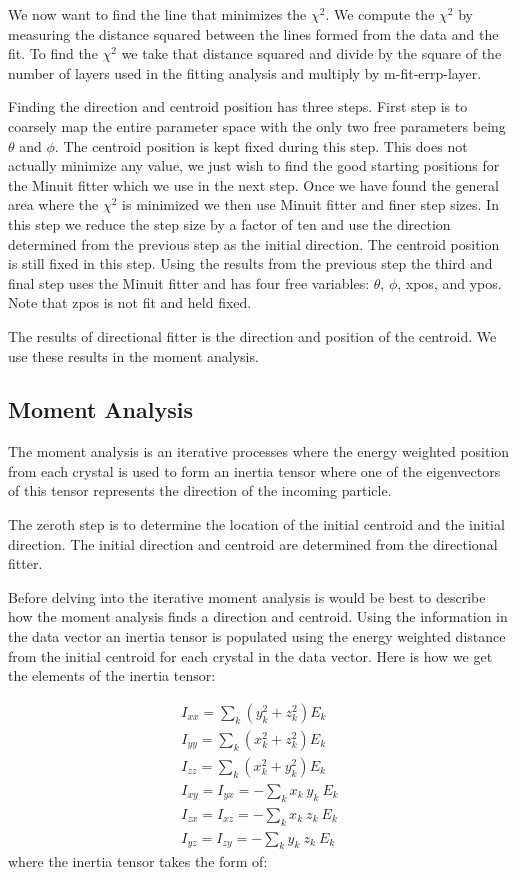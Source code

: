 \documentclass[11pt]{article}
\begin{document}
We now want to find the line that minimizes the $\chi^2$.  We compute the $\chi^2$ by measuring the distance squared between the lines formed from the data and the fit.  To find the $\chi^2$ we take that distance squared and divide by the square of the number of layers used in the fitting analysis and multiply by m-fit-errp-layer.  

Finding the direction and centroid position has three steps.  First step is to coarsely map the entire parameter space with the only two free parameters being $\theta$ and $\phi$.  The centroid position is kept fixed during this step.  This does not actually minimize any value, we just wish to find the good starting positions for the Minuit fitter which we use in the next step.  Once we have found the general area where the $\chi^2$ is minimized we then use Minuit fitter and finer step sizes.  In this step we reduce the step size by a factor of ten and use the direction determined from the previous step as the initial direction.  The centroid position is still fixed in this step.  Using the results from the previous step the third and final step uses the Minuit fitter and has four free variables: $\theta$, $\phi$, xpos, and ypos.   Note that zpos is not fit and held fixed.  

The results of directional fitter is the direction and position of the centroid.  We use these results in the moment analysis.

\subsection{Moment Analysis}

The moment analysis is an iterative processes where the energy weighted position from each crystal is used to form an inertia tensor where one of the eigenvectors of this tensor represents the direction of the incoming particle.  

The zeroth step is to determine the location of the initial centroid and the initial direction.  The initial direction and centroid are determined from the directional fitter.  

Before delving into the iterative moment analysis is would be best to describe how the moment analysis finds a direction and centroid.  Using the information in the data vector an inertia tensor is populated using the energy weighted distance from the initial centroid for each crystal in the data vector.    Here is how we get the elements of the inertia tensor:

\begin{eqnarray}
I_{xx} = \sum_k \left( y_k^2 + z_k^2 \right)E_k \\
I_{yy} = \sum_k \left( x_k^2 + z_k^2 \right)E_k \\ 
I_{zz} = \sum_k \left( x_k^2 + y_k^2  \right)E_k \\
I_{xy} = I_{yx} = - \sum_k x_k \ y_k \ E_k \\
I_{zx} = I_{xz} = - \sum_k x_k \ z_k \ E_k \\
I_{yz} = I_{zy} = - \sum_k y_k \ z_k \ E_k 
\end{eqnarray}
where the inertia tensor takes the form of:
\end{document}
